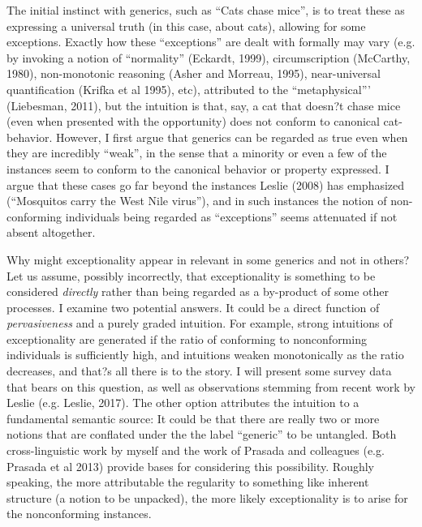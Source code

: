 \documentclass[10pt,letterpaper]{article}
\begin{document}
The initial instinct with generics, such as ``Cats chase mice'', is to treat these as expressing a universal truth (in this case, about cats), allowing for some exceptions.  Exactly how these ``exceptions'' are dealt with formally may vary (e.g. by invoking a notion of ``normality'' (Eckardt, 1999), circumscription (McCarthy, 1980), non-monotonic reasoning (Asher and Morreau, 1995), near-universal quantification (Krifka et al 1995), etc), attributed to the ``metaphysical'''  (Liebesman, 2011), but the intuition is that, say, a cat that doesn?t chase mice (even when presented with the opportunity) does not conform to canonical cat-behavior.  However, I first argue that generics can be regarded as true even when they are incredibly ``weak'', in the sense that a minority or even a few of the instances seem to conform to the canonical behavior or property expressed.  I argue that these cases go far beyond the instances Leslie (2008) has emphasized (``Mosquitos carry the West Nile virus''), and in such instances the notion of non-conforming individuals being regarded as ``exceptions'' seems attenuated if not absent altogether.

Why might exceptionality appear in relevant in some generics and not in others? 
Let us assume, possibly incorrectly, that exceptionality is something to be considered \emph{directly} rather than being regarded as a by-product of some other processes.  
I examine two potential answers. 
It could be a direct function of \emph{pervasiveness} and a purely graded intuition.
For example, strong intuitions of exceptionality are generated if the ratio of conforming to nonconforming individuals is sufficiently high, and intuitions weaken monotonically as the ratio decreases, and that?s all there is to the story.  
I will present some survey data that bears on this question, as well as observations stemming from recent work by Leslie (e.g. Leslie, 2017). 
The other option attributes the intuition to a fundamental semantic source: It could be that there are really two or more notions that are conflated under the the label ``generic'' to be untangled. 
Both cross-linguistic work by myself and the work of Prasada and colleagues (e.g. Prasada et al 2013) provide bases for considering this possibility.  
Roughly speaking, the more attributable the regularity to something like inherent structure (a notion to be unpacked), the more likely exceptionality is to arise for the nonconforming instances.



\setlength{\bibleftmargin}{.125in}
\setlength{\bibindent}{-\bibleftmargin}


\end{document}
